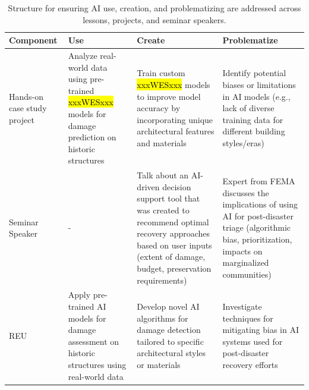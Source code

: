 \documentclass[11pt]{article}
\begin{document}
\begin{table}[h!]
\footnotesize
\centering
\caption{Structure for ensuring AI use, creation, and problematizing are addressed across lessons, projects, and seminar speakers.}
\begin{tabular}{|p{2cm}|p{4cm}|p{4cm}|p{4cm}|}
\rowcolor{mycmykcolor}
\hline
\small
\textbf{Component} & \textbf{Use} & \textbf{Create} & \textbf{Problematize} \\
\hline
Hands-on case study project & Analyze real-world data using pre-trained \hl{xxxWESxxx} models for damage prediction on historic structures & Train custom \hl{xxxWESxxx} models to improve model accuracy by incorporating unique architectural features and materials & Identify potential biases or limitations in AI models (e.g., lack of diverse training data for different building styles/eras) \\
\hline
Seminar Speaker & - & Talk about an AI-driven decision support tool that was created to recommend optimal recovery approaches based on user inputs (extent of damage, budget, preservation requirements) & Expert from FEMA discusses the implications of using AI for post-disaster triage (algorithmic bias, prioritization, impacts on marginalized communities) \\
\hline
REU & Apply pre-trained AI models for damage assessment on historic structures using real-world data & Develop novel AI algorithms for damage detection tailored to specific architectural styles or materials & Investigate techniques for mitigating bias in AI systems used for post-disaster recovery efforts \\
\hline
\end{tabular}
\label{tab:edu}
\end{table}
\normalsize
\end{document}
